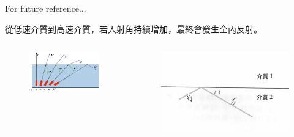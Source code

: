 \documentclass[13pt]{beamer}
\begin{document}
\begin{frame}{For future reference...}

    從低速介質到高速介質，若入射角持續增加，最終會發生全內反射。
    \bigskip
    \begin{columns}
        \begin{figure}
            \centering
            \includegraphics[width=1\linewidth]{images/Screenshot 2023-09-27 at 8.56.48 PM.png}


        \end{figure}
        \begin{figure}
            \centering
            \includegraphics[width=1\linewidth]{images/Screenshot 2023-09-27 at 8.57.33 PM.png}


        \end{figure}
    \end{columns}
\end{frame}
\end{document}
